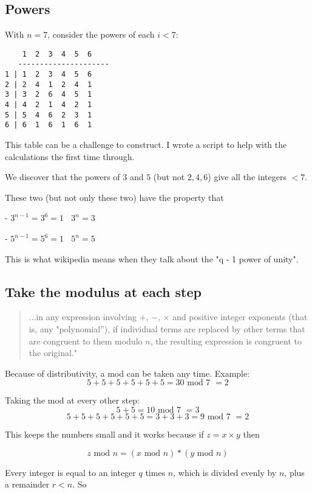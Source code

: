 \documentclass[11pt, oneside]{article}
\begin{document}
\subsection*{Powers}

With $n = 7$, consider the powers of each $ i < 7$:

\begin{verbatim}
    1  2  3  4  5  6
   ---------------------
1 | 1  2  3  4  5  6
2 | 2  4  1  2  4  1
3 | 3  2  6  4  5  1
4 | 4  2  1  4  2  1
5 | 5  4  6  2  3  1  
6 | 6  1  6  1  6  1
\end{verbatim}

This table can be a challenge to construct.  I wrote a script to help with the calculations the first time through. 

We discover that the powers of $3$ and $5$ (but not $2,4,6$) give all the integers $<7$.  

These two (but not only these two) have the property that

- $3^{n-1} = 3^6 = 1 \ \ \ \ 3^n = 3$

- $5^{n-1} = 5^6 = 1 \ \ \ \ 5^n = 5$

This is what wikipedia means when they talk about the "q - 1 power of unity".

\subsection*{Take the modulus at each step}

\begin{quote}...in any expression involving +, $-$, $\times$ and positive integer exponents (that is, any "polynomial''), if individual terms are replaced by other terms that are congruent to them modulo $n$, the resulting expression is congruent to the original."\end{quote}

Because of distributivity, a mod can be taken any time.  Example:
\[ 5 + 5 + 5 + 5  + 5 + 5 = 30 \text{ mod 7 } = 2 \]

Taking the mod at every other step:
\[ 5 + 5 = 10 \text{ mod 7 } = 3 \]
\[ 5 + 5 + 5 + 5 + 5 + 5 = 3 + 3 + 3 = 9 \text{ mod 7 } = 2 \]

This keeps the numbers small and it works because if $z = x \times y$ then

\[ z  \text{ mod } n = (x  \text{ mod } n) * (y  \text{ mod } n) \]

Every integer is equal to an integer $q$ times $ n$, which is divided evenly by $n$, plus a remainder $r < n$.  So
\end{document}
